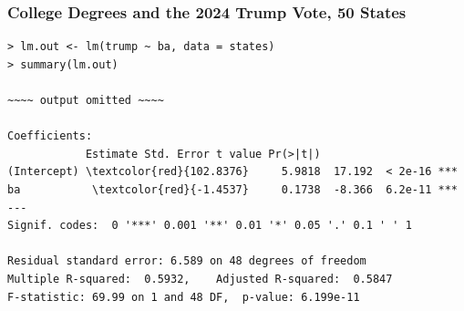 \documentclass[xcolor=svgnames,9pt,english,aspectratio=169,t]{beamer}
\begin{document}

\begin{frame}[fragile]
\frametitle{College Degrees and the 2024 Trump Vote, 50 States}
{
\footnotesize
\begin{Verbatim}[frame=single, label=R Code, commandchars=\\\{\}]
> lm.out <- lm(trump ~ ba, data = states)
> summary(lm.out)

~~~~ output omitted ~~~~

Coefficients:
            Estimate Std. Error t value Pr(>|t|)
(Intercept) \textcolor{red}{102.8376}     5.9818  17.192  < 2e-16 ***
ba           \textcolor{red}{-1.4537}     0.1738  -8.366  6.2e-11 ***
---
Signif. codes:  0 '***' 0.001 '**' 0.01 '*' 0.05 '.' 0.1 ' ' 1

Residual standard error: 6.589 on 48 degrees of freedom
Multiple R-squared:  0.5932,	Adjusted R-squared:  0.5847
F-statistic: 69.99 on 1 and 48 DF,  p-value: 6.199e-11
\end{Verbatim}
}
\end{frame}

\end{document}
